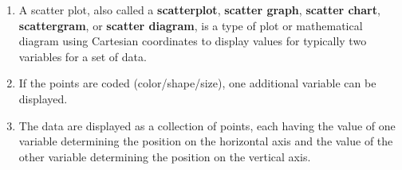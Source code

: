 \begin{enumerate}
    \item A scatter plot, also called a \textbf{scatterplot}, \textbf{scatter graph}\label{Visualizing Data/scatter graph}, \textbf{scatter chart}\label{Visualizing Data/scatter chart}, \textbf{scattergram}\label{Visualizing Data/scattergram}, or \textbf{scatter diagram}\label{Visualizing Data/scatter diagram}, is a type of plot or mathematical diagram using Cartesian coordinates to display values for typically two variables for a set of data. \hfill \cite{data/online/wiki/Scatter_plot}
    
    \item If the points are coded (color/shape/size), one additional variable can be displayed. \hfill \cite{data/online/wiki/Scatter_plot}
    
    \item The data are displayed as a collection of points, each having the value of one variable determining the position on the horizontal axis and the value of the other variable determining the position on the vertical axis. \hfill \cite{data/online/wiki/Scatter_plot}
\end{enumerate}






